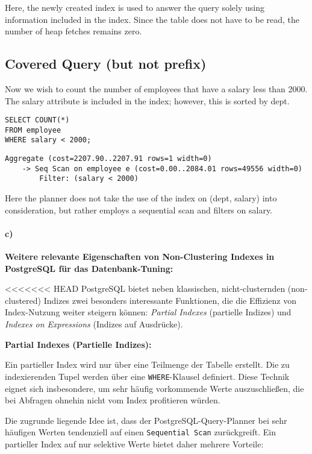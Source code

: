 \documentclass[11pt]{scrartcl}
\begin{document}
Here, the newly created index is used to answer the query solely using information included in the index.  Since the table does not have to be read, the number of heap fetches remains zero.

\subsection{Covered Query (but not prefix)}

Now we wish to count the number of employees that have a salary less than 2000. The salary attribute is included in the index; however, this is sorted by dept.

\begin{lstlisting}[style=dbtsql]
SELECT COUNT(*)
FROM employee
WHERE salary < 2000;
\end{lstlisting}

\begin{lstlisting}
Aggregate (cost=2207.90..2207.91 rows=1 width=0)
    -> Seq Scan on employee e (cost=0.00..2084.01 rows=49556 width=0)
        Filter: (salary < 2000)
\end{lstlisting}

Here the planner does not take the use of the index on (dept, salary) into consideration, but rather employs a sequential scan and filters on salary.

\paragraph{c)}

\textbf{Weitere relevante Eigenschaften von Non-Clustering Indexes in PostgreSQL für das Datenbank-Tuning:}

<<<<<<< HEAD
PostgreSQL bietet neben klassischen, nicht-clusternden (non-clustered) Indizes zwei besonders interessante Funktionen, die die Effizienz von Index-Nutzung weiter steigern können: \textit{Partial Indexes} (partielle Indizes) und \textit{Indexes on Expressions} (Indizes auf Ausdrücke).

\vspace{0.5em}
\noindent\textbf{Partial Indexes (Partielle Indizes):}

Ein partieller Index wird nur über eine Teilmenge der Tabelle erstellt. Die zu indexierenden Tupel werden über eine \texttt{WHERE}-Klausel definiert. Diese Technik eignet sich insbesondere, um sehr häufig vorkommende Werte auszuschließen, die bei Abfragen ohnehin nicht vom Index profitieren würden.

Die zugrunde liegende Idee ist, dass der PostgreSQL-Query-Planner bei sehr häufigen Werten tendenziell auf einen \texttt{Sequential Scan} zurückgreift. Ein partieller Index auf nur selektive Werte bietet daher mehrere Vorteile:
\end{document}
